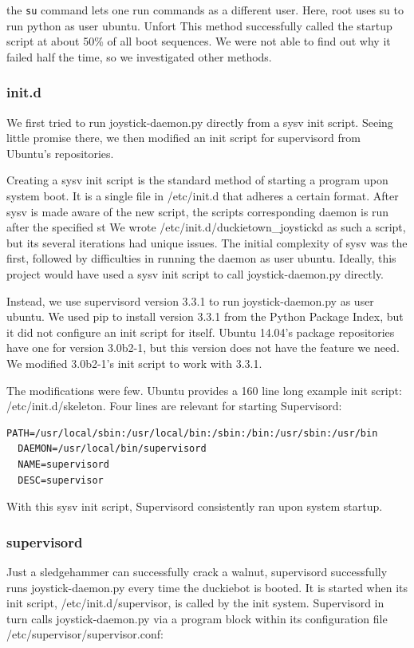 \documentclass[titlepage]{article}
\begin{document}
the \texttt{su} command lets one run commands as a different user. Here, root uses su to run python as user ubuntu. Unfort
This method successfully called the startup script at about 50\% of all boot sequences. 
We were not able to find out why it failed half the time, so we investigated other methods.

\subsubsection{init.d}
We first tried to run joystick-daemon.py directly from a sysv init script. Seeing little promise there, we then modified an init script for supervisord from Ubuntu's repositories. 

Creating a sysv init script is the standard method of starting a program upon system boot. 
It is a single file in /etc/init.d that adheres a certain format. 
After sysv is made aware of the new script, the scripts corresponding daemon is run after the specified st
We wrote /etc/init.d/duckietown\_joystickd as such a script, but its several iterations had unique issues. 
The initial complexity of sysv was the first, followed by difficulties in running the daemon as user ubuntu.
Ideally, this project would have used a sysv init script to call joystick-daemon.py directly. 

Instead, we use supervisord version 3.3.1 to run joystick-daemon.py as user ubuntu. We used pip to install version 3.3.1 from the Python Package Index, but it did not configure an init script for itself. Ubuntu 14.04's package repositories have one for version 3.0b2-1, but this version does not have the feature we need. We modified 3.0b2-1's init script to work with 3.3.1. 

The modifications were few. Ubuntu provides a 160 line long example init script: /etc/init.d/skeleton. Four lines are relevant for starting Supervisord:
\begin{lstlisting}
PATH=/usr/local/sbin:/usr/local/bin:/sbin:/bin:/usr/sbin:/usr/bin
  DAEMON=/usr/local/bin/supervisord
  NAME=supervisord
  DESC=supervisor
\end{lstlisting}

With this sysv init script, Supervisord consistently ran upon system startup. 
\subsubsection{supervisord}
Just a sledgehammer can successfully crack a walnut, supervisord successfully runs joystick-daemon.py every time the duckiebot is booted. 
It is started when its init script, /etc/init.d/supervisor, is called by the init system. 
Supervisord in turn calls joystick-daemon.py via a program block within its configuration file /etc/supervisor/supervisor.conf:
\end{document}
